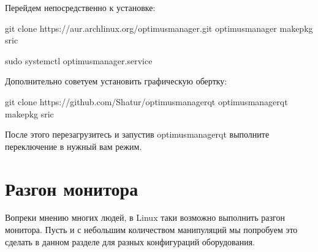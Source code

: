 \documentclass[letterpaper,10pt,russian,openany]{sphinxmanual}
\begin{document}
\sphinxAtStartPar
Перейдем непосредственно к установке:

\begin{sphinxVerbatim}[commandchars=\\\{\}]
git clone https://aur.archlinux.org/optimus\PYGZhy{}manager.git 
 optimus\PYGZhy{}manager                                      
makepkg \PYGZhy{}sric                                           

sudo systemctl  optimus\PYGZhy{}manager.service 
\end{sphinxVerbatim}

\sphinxAtStartPar
Дополнительно советуем установить графическую обертку:

\begin{sphinxVerbatim}[commandchars=\\\{\}]
git clone https://github.com/Shatur/optimus\PYGZhy{}manager\PYGZhy{}qt  
 optimus\PYGZhy{}manager\PYGZhy{}qt                                   
makepkg \PYGZhy{}sric                                           
\end{sphinxVerbatim}

\sphinxAtStartPar
После этого перезагрузитесь и запустив optimus\sphinxhyphen{}manager\sphinxhyphen{}qt выполните переключение в нужный вам режим.

\ignorespaces 

\section{Разгон монитора }
\label{\detokenize{source/first-steps:monitor-overlocking}}\label{\detokenize{source/first-steps:index-16}}\label{\detokenize{source/first-steps:id15}}
\sphinxAtStartPar
Вопреки мнению многих людей, в Linux таки возможно выполнить разгон монитора.
Пусть и с небольшим количеством манипуляций мы попробуем это сделать в данном разделе
для разных конфигураций оборудования.
\end{document}
